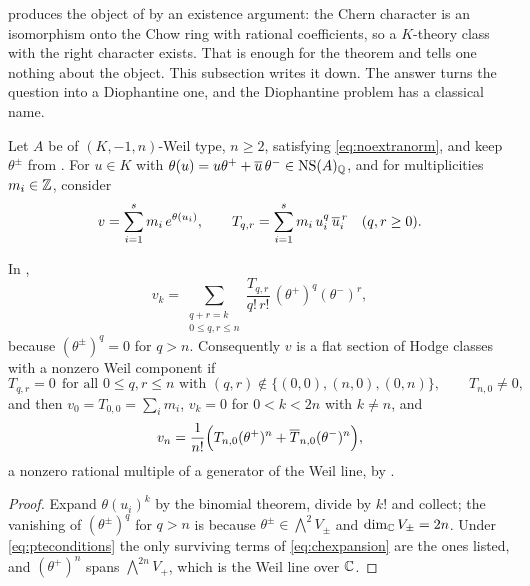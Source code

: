  produces the object of  by an
existence argument: the Chern character is an isomorphism onto the Chow ring
with rational coefficients, so a $K$-theory class with the right character
exists. That is enough for the theorem and tells one nothing about the object.
This subsection writes it down. The answer turns the question into a
Diophantine one, and the Diophantine problem has a classical name.

\begin{setupenv}\label{setup:pte}
Let $A$ be of $(K,-1,n)$-Weil type, $n\ge2$, satisfying
\eqref{eq:noextranorm}, and keep $\theta^{\pm}$ from
. For $u\in K$ with $\theta(u)=u\theta^{+}+\overline{u}\,\theta^{-}\in\mathrm{NS}(A)_{\mathbb{Q}}$, and for multiplicities $m_{i}\in\mathbb{Z}$, consider
\[
  v=\sum_{i=1}^{s}m_{i}\,e^{\theta(u_{i})},
  \qquad
  T_{q,r}=\sum_{i=1}^{s}m_{i}\,u_{i}^{q}\,\overline{u}_{i}^{\,r}
  \quad (q,r\ge0).
\]
\end{setupenv}

\begin{proposition}
\label{prop:chintermsofu}
In ,
\begin{equation}\label{eq:chexpansion}
  v_{k}
  =\sum_{\substack{q+r=k\\ 0\le q,r\le n}}
    \frac{T_{q,r}}{q!\,r!}\,(\theta^{+})^{q}(\theta^{-})^{r},
\end{equation}
because $(\theta^{\pm})^{q}=0$ for $q>n$. Consequently $v$ is a flat section
of Hodge classes with a nonzero Weil component if
\begin{equation}\label{eq:pteconditions}
  T_{q,r}=0\ \ \text{for all } 0\le q,r\le n \text{ with }
  (q,r)\notin\{(0,0),(n,0),(0,n)\},
  \qquad T_{n,0}\ne0,
\end{equation}
and then $v_{0}=T_{0,0}=\sum_{i}m_{i}$, $v_{k}=0$ for $0<k<2n$ with $k\ne n$,
and
\[
  v_{n}=\frac{1}{n!}\Bigl(T_{n,0}(\theta^{+})^{n}
        +\overline{T}_{n,0}(\theta^{-})^{n}\Bigr),
\]
a nonzero rational multiple of a generator of the Weil line, by
\cite[Theorem~15.2]{paperI}.
\end{proposition}

\begin{proof}
Expand $\theta(u_{i})^{k}$ by the binomial theorem, divide by $k!$ and collect;
the vanishing of $(\theta^{\pm})^{q}$ for $q>n$ is because
$\theta^{\pm}\in\bigwedge^{2}V_{\pm}$ and $\dim_{\mathbb{C}}V_{\pm}=2n$. Under
\eqref{eq:pteconditions} the only surviving terms of \eqref{eq:chexpansion}
are the ones listed, and $(\theta^{+})^{n}$ spans $\bigwedge^{2n}V_{+}$, which
is the Weil line over $\mathbb{C}$.
\end{proof}

